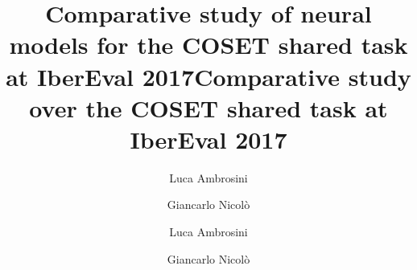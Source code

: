 



\author{Luca Ambrosini \and Giancarlo Nicol\`{o}}
\title{Comparative study of neural models for the COSET shared task at IberEval 2017}
\author{Luca Ambrosini \and Giancarlo Nicol\`{o}}
\title{Comparative study over the COSET shared task at IberEval 2017}
\date{}







\maketitle


 


